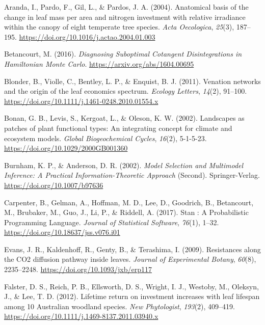 \documentclass[
  12pt,
  a4paper,
,tablecaptionabove
]{scrartcl}
\newlength{\cslhangindent}
\newenvironment{CSLReferences}[2] %
 {%
  \setlength{\parindent}{0pt}
  \ifodd #1 \everypar{\setlength{\hangindent}{\cslhangindent}}\ignorespaces\fi
  \ifnum #2 > 0
  \setlength{\parskip}{#2\baselineskip}
  \fi
 }%
 {}
\begin{document}
\hypertarget{refs}{}
\begin{CSLReferences}{1}{0}
\leavevmode{}%
Aranda, I., Pardo, F., Gil, L., \& Pardos, J. A. (2004). Anatomical
basis of the change in leaf mass per area and nitrogen investment with
relative irradiance within the canopy of eight temperate tree species.
\emph{Acta Oecologica}, \emph{25}(3), 187--195.
\url{https://doi.org/10.1016/j.actao.2004.01.003}

\leavevmode{}%
Betancourt, M. (2016). \emph{Diagnosing {Suboptimal Cotangent
Disintegrations} in {Hamiltonian Monte Carlo}}.
\url{https://arxiv.org/abs/1604.00695}

\leavevmode{}%
Blonder, B., Violle, C., Bentley, L. P., \& Enquist, B. J. (2011).
Venation networks and the origin of the leaf economics spectrum.
\emph{Ecology Letters}, \emph{14}(2), 91--100.
\url{https://doi.org/10.1111/j.1461-0248.2010.01554.x}

\leavevmode{}%
Bonan, G. B., Levis, S., Kergoat, L., \& Oleson, K. W. (2002).
Landscapes as patches of plant functional types: {An} integrating
concept for climate and ecosystem models. \emph{Global Biogeochemical
Cycles}, \emph{16}(2), 5-1-5-23.
\url{https://doi.org/10.1029/2000GB001360}

\leavevmode{}%
Burnham, K. P., \& Anderson, D. R. (2002). \emph{Model {Selection} and
{Multimodel Inference}: {A Practical Information-Theoretic Approach}}
(Second). {Springer-Verlag}. \url{https://doi.org/10.1007/b97636}

\leavevmode{}%
Carpenter, B., Gelman, A., Hoffman, M. D., Lee, D., Goodrich, B.,
Betancourt, M., Brubaker, M., Guo, J., Li, P., \& Riddell, A. (2017).
Stan : {A Probabilistic Programming Language}. \emph{Journal of
Statistical Software}, \emph{76}(1), 1--32.
\url{https://doi.org/10.18637/jss.v076.i01}

\leavevmode{}%
Evans, J. R., Kaldenhoff, R., Genty, B., \& Terashima, I. (2009).
Resistances along the {CO2} diffusion pathway inside leaves.
\emph{Journal of Experimental Botany}, \emph{60}(8), 2235--2248.
\url{https://doi.org/10.1093/jxb/erp117}

\leavevmode{}%
Falster, D. S., Reich, P. B., Ellsworth, D. S., Wright, I. J., Westoby,
M., Oleksyn, J., \& Lee, T. D. (2012). Lifetime return on investment
increases with leaf lifespan among 10 {Australian} woodland species.
\emph{New Phytologist}, \emph{193}(2), 409--419.
\url{https://doi.org/10.1111/j.1469-8137.2011.03940.x}


\end{CSLReferences}
\end{document}
